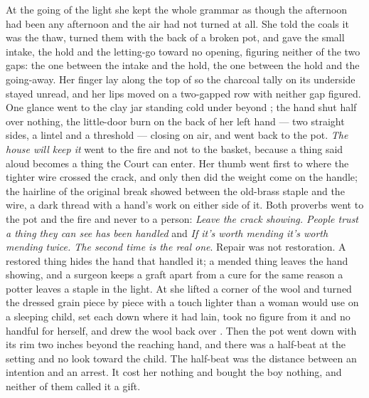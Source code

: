 At the going of the light she kept the whole grammar as though the afternoon had been any afternoon and the air had not turned at all. She told the coals it was the thaw, turned them with the back of a broken pot, and gave the small intake, the hold and the letting-go toward no opening, figuring neither of the two gaps: the one between the intake and the hold, the one between the hold and the going-away. Her finger lay along the top of  so the charcoal tally on its underside stayed unread, and her lips moved on a two-gapped row with neither gap figured. One glance went to the clay jar standing cold under  beyond ; the hand shut half over nothing, the little-door burn on the back of her left hand --- two straight sides, a lintel and a threshold --- closing on air, and went back to the pot. \emph{The house will keep it} went to the fire and not to the basket, because a thing said aloud becomes a thing the Court can enter. Her thumb went first to where the tighter wire crossed the crack, and only then did the weight come on the handle; the hairline of the original break showed between the old-brass staple and the wire, a dark thread with a hand's work on either side of it. Both proverbs went to the pot and the fire and never to a person: \emph{Leave the crack showing. People trust a thing they can see has been handled} and \emph{If it's worth mending it's worth mending twice. The second time is the real one}. Repair was not restoration. A restored thing hides the hand that handled it; a mended thing leaves the hand showing, and a surgeon keeps a graft apart from a cure for the same reason a potter leaves a staple in the light. At  she lifted a corner of the wool and turned the dressed grain piece by piece with a touch lighter than a woman would use on a sleeping child, set each down where it had lain, took no figure from it and no handful for herself, and drew the wool back over . Then the pot went down with its rim two inches beyond the reaching hand, and there was a half-beat at the setting and no look toward the child. The half-beat was the distance between an intention and an arrest. It cost her nothing and bought the boy nothing, and neither of them called it a gift.

